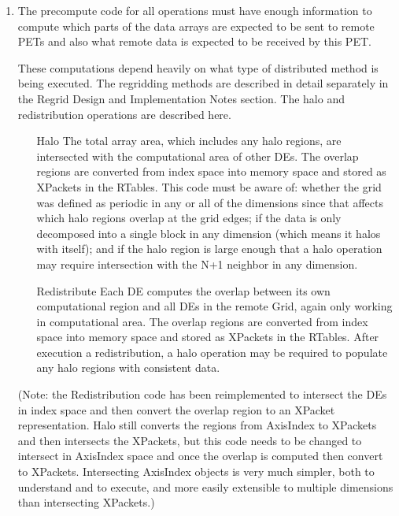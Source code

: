 \begin{enumerate}
\item

The precompute code for all operations must have enough
information to compute which parts of the data arrays
are expected to be sent to remote PETs and also what
remote data is expected to be received by this PET.

These computations depend heavily on what type of distributed
method is being executed.  The regridding methods are described
in detail separately in the Regrid Design and Implementation Notes
section.  The halo and redistribution operations are described here.

\begin{enumerate}

\item[Halo] The total array area, which includes any halo regions,
are intersected with the computational
area of other DEs. The overlap regions are converted from index
space into memory space and stored as XPackets in the RTables.
This code must be aware of: whether the grid was defined as
periodic in any or all of the dimensions since that affects
which halo regions overlap at the grid edges; if the data
is only decomposed into a single block in any dimension (which
means it halos with itself); and if the halo region is large
enough that a halo operation may require intersection with
the N+1 neighbor in any dimension.  

\item[Redistribute]  Each DE computes the overlap
between its own computational region and all DEs in the 
remote Grid, again only working in computational area.  
The overlap regions are converted from index
space into memory space and stored as XPackets in the RTables.
After execution a redistribution, a halo operation may be required
to populate any halo regions with consistent data.

\end{enumerate}
(Note: the Redistribution code has been reimplemented to intersect
the DEs in index space and then convert the overlap region to an XPacket
representation.  Halo still converts the regions from AxisIndex to 
XPackets and then intersects the XPackets, but this code needs to be
changed to intersect in AxisIndex space and once the overlap is computed
then convert to XPackets.  Intersecting AxisIndex objects is very 
much simpler, both to understand and to execute, and more easily 
extensible to multiple dimensions than intersecting XPackets.)

\end{enumerate}

